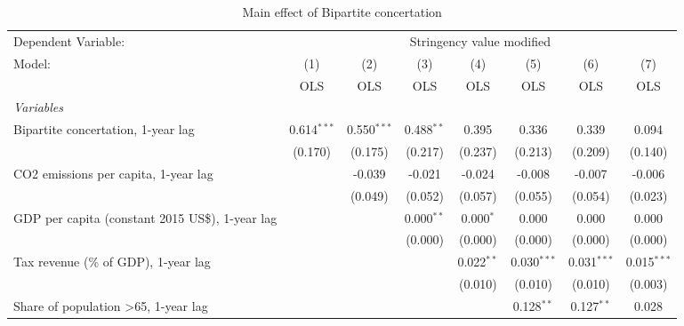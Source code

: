 
\begin{table}[htbp]
   \caption{Main effect of Bipartite concertation}
   \centering
   \begin{tabular}{lccccccc}
      \toprule
      Dependent Variable: & \multicolumn{7}{c}{Stringency value modified}\\
      Model:                                                & (1)           & (2)           & (3)          & (4)          & (5)           & (6)           & (7)\\  
                                                            &  OLS          & OLS           & OLS          & OLS          & OLS           & OLS           & OLS\\  
      \midrule
      \emph{Variables}\\
      Bipartite concertation, 1-year lag                    & 0.614$^{***}$ & 0.550$^{***}$ & 0.488$^{**}$ & 0.395        & 0.336         & 0.339         & 0.094\\   
                                                            & (0.170)       & (0.175)       & (0.217)      & (0.237)      & (0.213)       & (0.209)       & (0.140)\\   
      CO2 emissions per capita, 1-year lag                  &               & -0.039        & -0.021       & -0.024       & -0.008        & -0.007        & -0.006\\   
                                                            &               & (0.049)       & (0.052)      & (0.057)      & (0.055)       & (0.054)       & (0.023)\\   
      GDP per capita (constant 2015 US\$), 1-year lag       &               &               & 0.000$^{**}$ & 0.000$^{*}$  & 0.000         & 0.000         & 0.000\\   
                                                            &               &               & (0.000)      & (0.000)      & (0.000)       & (0.000)       & (0.000)\\   
      Tax revenue (\% of GDP), 1-year lag                   &               &               &              & 0.022$^{**}$ & 0.030$^{***}$ & 0.031$^{***}$ & 0.015$^{***}$\\   
                                                            &               &               &              & (0.010)      & (0.010)       & (0.010)       & (0.003)\\   
      Share of population >65, 1-year lag                   &               &               &              &              & 0.128$^{**}$  & 0.127$^{**}$  & 0.028\\   

\end{tabular}
\end{table}
